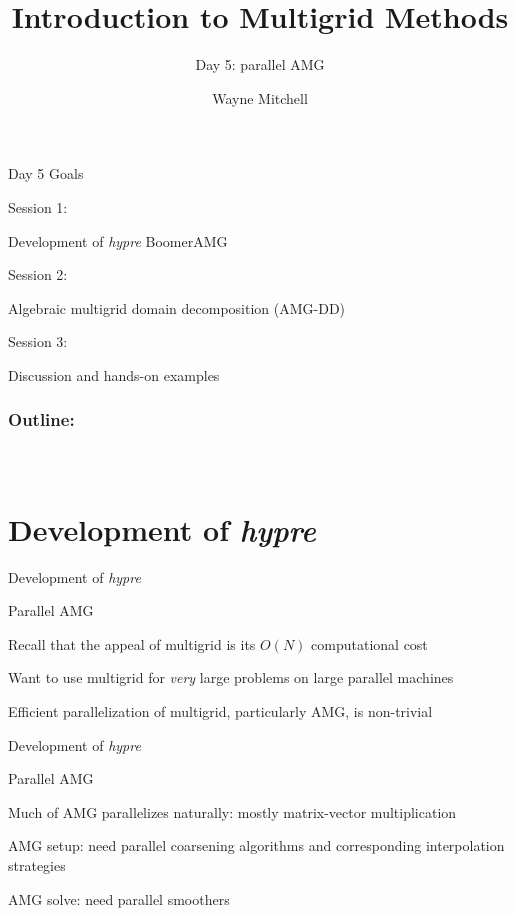 \documentclass[18pt,xcolor=table]{beamer}
\title[Multigrid]{Introduction to Multigrid Methods}
\subtitle{Day 5: parallel AMG}
\author[Mitchell]{Wayne Mitchell}
\institute{\pgfuseimage{logo}\\Universit\"at Heidelberg\\Institut f\"ur Technische Informatik}
\date[]{\alert{}}
\begin{document}


\DeclareRobustCommand{\Chi}{\raisebox{2pt}{$\chi$}}

\begin{frame}{}
\begin{block}{Day 5 Goals}
\bit
\item Session 1:
\bit
\item Development of \emph{hypre} BoomerAMG
\eit
\item Session 2:
\bit
\item Algebraic multigrid domain decomposition (AMG-DD)
\eit
\item Session 3:
\bit
\item Discussion and hands-on examples
\eit
\eit
\end{block}
\end{frame}

\begin{frame}
\frametitle{\bf Outline:}
\framesubtitle{~~}
\tableofcontents
\end{frame}


\section{Development of \emph{hypre}}

\begin{frame}{Development of \emph{hypre}}
\begin{block}{Parallel AMG}
\bit
\item Recall that the appeal of multigrid is its $O(N)$ computational cost
\item Want to use multigrid for \emph{very} large problems on large parallel machines
\item Efficient parallelization of multigrid, particularly AMG, is non-trivial
\eit
\end{block}
\end{frame}

\begin{frame}{Development of \emph{hypre}}
\begin{block}{Parallel AMG}
\bit
\item Much of AMG parallelizes naturally: mostly matrix-vector multiplication
\item AMG setup: need parallel coarsening algorithms and corresponding interpolation strategies
\item AMG solve: need parallel smoothers
\eit
\end{block}
\end{frame}
\end{document}
